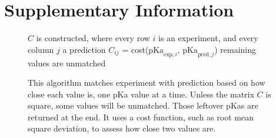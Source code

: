 \documentclass[9pt,lineno,final]{elife}
\newcommand{\pKa}{\mathrm{pKa}}
\begin{document}
\nocite{*} %




\appendix

\section{Supplementary Information}





\begin{figure}

\begin{algorithm}[H]
	\SetAlgoLined
	\caption{This algorithm matches experiment with prediction based on how close each value is, one pKa value at a time. Unless the matrix $C$ is square, some values will be unmatched. Those leftover pKas are returned at the end. It uses a cost function, such as root mean square deviation, to assess how close two values are.}
	\label{alg:closest}
	 
	$C$ is constructed, where every row  $i$ is an experiment, and every column $j$ a prediction\;
	$C_{ij}$ = cost($\pKa_{\text{exp},i}$, $\pKa_{\text{pred},j}$)\;
	remaining values are unmatched\;
\label{alg:closest}
\end{algorithm}
\end{figure}
\end{document}
